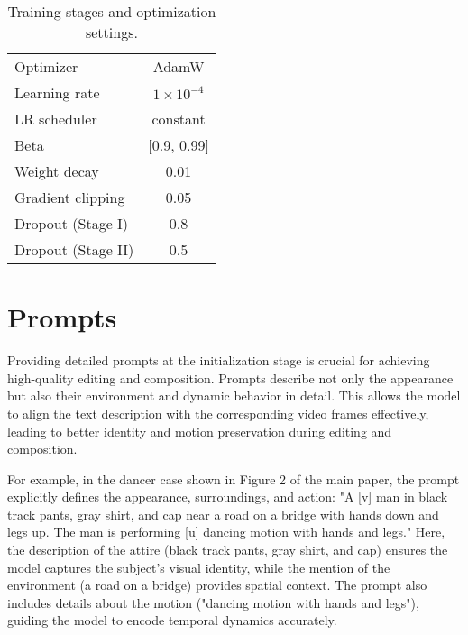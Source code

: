 \begin{table}[t]
\centering
\begin{tabular}{@{}lcc@{}}
\toprule
Optimizer                   & \multicolumn{2}{c}{AdamW}              \\
Learning rate               & \multicolumn{2}{c}{$1 \times 10^{-4}$} \\
LR scheduler                & \multicolumn{2}{c}{constant}           \\
Beta                        & \multicolumn{2}{c}{[0.9, 0.99]}        \\
Weight decay                & \multicolumn{2}{c}{0.01}               \\
Gradient clipping           & \multicolumn{2}{c}{0.05}               \\
Dropout (Stage I)           & \multicolumn{2}{c}{0.8}                \\
Dropout (Stage II)           & \multicolumn{2}{c}{0.5}                \\\bottomrule
\end{tabular}
\caption{Training stages and optimization settings.}
\label{tab:training_stages}
\end{table}


\section{Prompts} Providing detailed prompts at the initialization stage is crucial for achieving high-quality editing and composition. Prompts describe not only the appearance but also their environment and dynamic behavior in detail. This allows the model to align the text description with the corresponding video frames effectively, leading to better identity and motion preservation during editing and composition.

For example, in the dancer case shown in Figure 2 of the main paper, the prompt explicitly defines the appearance, surroundings, and action: "A [v] man in black track pants, gray shirt, and cap near a road on a bridge with hands down and legs up. The man is performing [u] dancing motion with hands and legs." Here, the description of the attire (black track pants, gray shirt, and cap) ensures the model captures the subject's visual identity, while the mention of the environment (a road on a bridge) provides spatial context. The prompt also includes details about the motion ("dancing motion with hands and legs"), guiding the model to encode temporal dynamics accurately.

